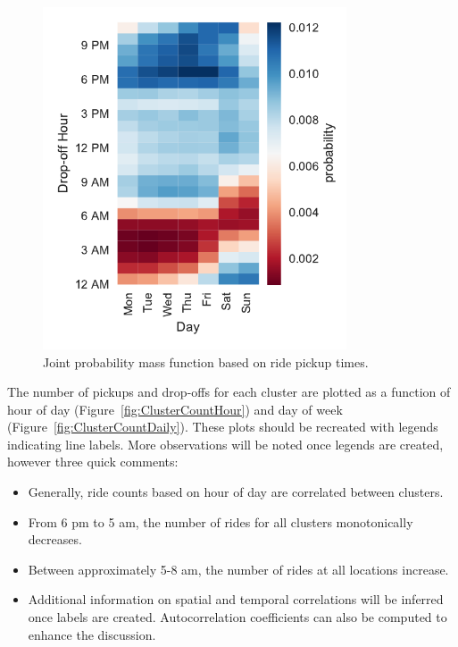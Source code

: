\documentclass[twocolumn,10pt]{article}
\begin{document}
\begin{figure}
\centering
\includegraphics[width=90mm]{JointMassFunction}
\caption{Joint probability mass function based on ride pickup times.}
\label{fig:JointMassFunction}
\end{figure}

The number of pickups and drop-offs for each cluster are plotted as a function of hour of day (Figure~\ref{fig:ClusterCountHour}) and day of week (Figure~\ref{fig:ClusterCountDaily}). These plots should be recreated with legends indicating line labels. More observations will be noted once legends are created, however three quick comments:

\begin{itemize}
\item Generally, ride counts based on hour of day are correlated between clusters.
\item From 6 pm to 5 am, the number of rides for all clusters monotonically decreases.
\item Between approximately 5-8 am, the number of rides at all locations increase.  
\item Additional information on spatial and temporal correlations will be inferred once labels are created. Autocorrelation coefficients can also be computed to enhance the discussion.  
\end{itemize} 
\end{document}
